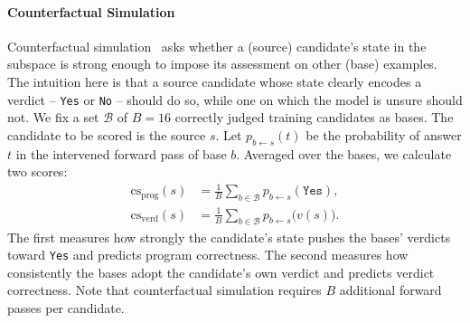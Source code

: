 \paragraph{Counterfactual Simulation}
Counterfactual simulation~\cite{Huang2025Internal} asks whether a (source) candidate's
state in the subspace is strong enough to impose its assessment on other
(base) examples. The intuition here is that a source candidate whose state clearly encodes a verdict -- \texttt{Yes} or \texttt{No} --
should do so, while one on which the model is unsure should not. 
We fix a set $\mathcal{B}$ of $B {=} 16$ correctly judged training candidates as bases. 
The candidate to be scored is the source $s$. 
Let $p_{b \leftarrow s}(t)$ be the probability of answer $t$ in the intervened
forward pass of base $b$. Averaged over the bases, we calculate two scores:
\begin{align}
\mathrm{cs}_{\mathrm{prog}}(s) &= \frac{1}{B}\sum_{b \in \mathcal{B}}
p_{b \leftarrow s}(\texttt{Yes}), \\
\mathrm{cs}_{\mathrm{verd}}(s) &= \frac{1}{B}\sum_{b \in \mathcal{B}}
p_{b \leftarrow s}\bigl(v(s)\bigr).
\end{align}
The first measures how strongly the candidate's state pushes the bases' verdicts toward
\texttt{Yes} and predicts program correctness. 
The second measures how consistently the bases adopt the candidate's own verdict and predicts verdict
correctness. Note that counterfactual simulation requires $B$ additional forward passes per candidate.

